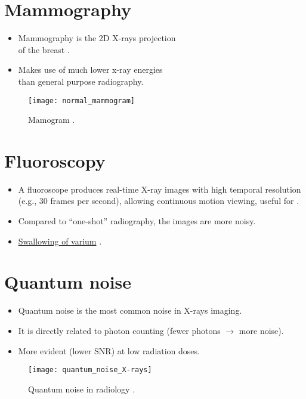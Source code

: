 \section{Mammography}
\begin{itemize}
\item Mammography is the 2D X-rays projection\\ of the breast
  \cite{bushberg2011essential}.
\item Makes use of much lower x-ray energies\\ than general purpose
  radiography.
\end{itemize}
\vspace{-20ex}
\begin{figure}[!h]
  \begin{flushright}
    \texttt{[image: normal\_mammogram]}
    \end{flushright}
    \caption{Mamogram \cite{CDC_mammograms}.\label{fig:mamogram}}
\end{figure}

\section{Fluoroscopy}
\begin{itemize}
\item A fluoroscope produces real-time X-ray images with high temporal
  resolution (e.g., 30 frames per second), allowing continuous motion
  viewing, useful for 
  \cite{bushberg2011essential}.
\item Compared to ``one-shot'' radiography, the images are more noisy.
\item
  \href{https://en.wikipedia.org/wiki/Fluoroscopy#/media/File:Normal_barium_swallow_animation.gif}{Swallowing
    of varium} \cite{Wikipedia_Fluoroscopy}.
\end{itemize}

\section{Quantum noise}
\begin{itemize}
\item Quantum noise is the most common noise in X-rays imaging.
\item It is directly related to photon counting (fewer photons
  $\rightarrow$ more noise).
\item More evident (lower \gls{SNR}) at low radiation doses.
\end{itemize}
\vspace{-4ex}
\begin{figure}[!h]
  \centering
    \texttt{[image: quantum\_noise\_X-rays]}
    \caption{Quantum noise in radiology
      \cite{CHANDRA2020107426}.\label{fig:quantum_noise_X-rays}}
\end{figure}

